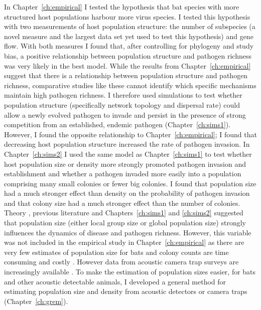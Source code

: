 In Chapter~\ref{ch:empirical} I tested the hypothesis that bat species with more structured host populations harbour more virus species.
I tested this hypothesis with two measurements of host population structure: the number of subspecies (a novel measure and the largest data set yet used to test this hypothesis) and gene flow.
With both measures I found that, after controlling for phylogeny and study bias, a positive relationship between population structure and pathogen richness was very likely in the best model.
While the results from Chapter~\ref{ch:empirical} suggest that there is a relationship between population structure and pathogen richness, comparative studies like these cannot identify which specific mechanisms maintain high pathogen richness.
I therefore used simulations to test whether population structure (specifically network topology and dispersal rate) could allow a newly evolved pathogen to invade and persist in the presence of strong competition from an established, endemic pathogen (Chapter~\ref{ch:sims1}).
However, I found the opposite relationship to Chapter~\ref{ch:empirical}; I found that decreasing host population structure increased the rate of pathogen invasion.
In Chapter~\ref{ch:sims2} I used the same model as Chapter~\ref{ch:sims1} to test whether host population size or density more strongly promoted pathogen invasion and establishment and whether a pathogen invaded more easily into a population comprising many small colonies or fewer big colonies.
I found that population size had a much stronger effect than density on the probability of pathogen invasion and that colony size had a much stronger effect than the number of colonies.
Theory \cite{may1979population, anderson1979population}, previous literature \cite{kamiya2014determines, nunn2003comparative, morand1998density} and Chapters~\ref{ch:sims1} and \ref{ch:sims2} suggested that population size (either local group size or global population size) strongly influences the dynamics of disease and pathogen richness.
However, this variable was not included in the empirical study in Chapter~\ref{ch:empirical} as there are very few estimates of population size for bats and colony counts are time consuming and costly \cite{kloepper2016estimating}.
However data from acoustic camera trap surveys are increasingly available \cite{jones2011indicator}.
To make the estimation of population sizes easier, for bats and other acoustic detectable animals, I developed a general method for estimating population size and density from acoustic detectors or camera traps (Chapter~\ref{ch:grem}).


